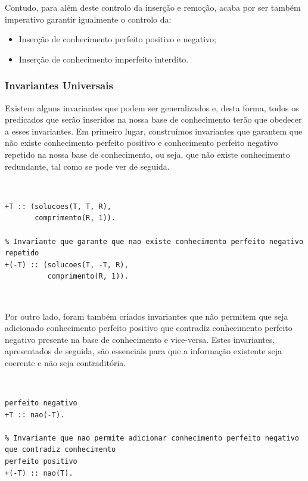 \documentclass[a4paper, 11pt]{article}
\begin{document}
Contudo, para além deste controlo da inserção e remoção, acaba por ser também imperativo 
garantir igualmente o controlo da:

\begin{itemize}
    \item Inserção de conhecimento perfeito positivo e negativo;
    \item Inserção de conhecimento imperfeito interdito.
\end{itemize}

\subsubsection{Invariantes Universais}

Existem alguns invariantes que podem ser generalizados e, desta forma, todos os
predicados que serão inseridos na nossa base de conhecimento terão que obedecer a esses
invariantes.
Em primeiro lugar, construímos invariantes que garantem que não existe
conhecimento perfeito positivo e conhecimento perfeito negativo repetido na nossa base de
conhecimento, ou seja, que não existe conhecimento redundante, tal como se pode ver de seguida.

\

\begin{lstlisting}[caption={Invariantes relativos ao conhecimento repetido}]
% Invariante que garante que nao existe conhecimento perfeito positivo repetido
+T :: (solucoes(T, T, R),
       comprimento(R, 1)).

% Invariante que garante que nao existe conhecimento perfeito negativo repetido
+(-T) :: (solucoes(T, -T, R),
          comprimento(R, 1)).
\end{lstlisting}

\

Por outro lado, foram também criados invariantes que não permitem que seja adicionado 
conhecimento perfeito positivo que contradiz conhecimento perfeito negativo
presente na base de conhecimento e vice-versa.
Estes invariantes, apresentados de seguida, são essenciais para que a informação existente seja 
coerente e não seja contraditória.

\

\begin{lstlisting}[caption={Invariante relativos ao conhecimento contraditório}]
% Invariante que nao permite adicionar conhecimento perfeito positivo que contradiz conhecimento 
perfeito negativo
+T :: nao(-T).

% Invariante que nao permite adicionar conhecimento perfeito negativo que contradiz conhecimento 
perfeito positivo
+(-T) :: nao(T).
\end{lstlisting}
\end{document}
